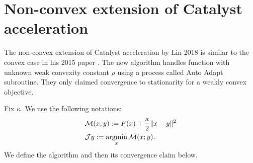 \documentclass[12pt]{article}
\begin{document}
\section{Non-convex extension of Catalyst acceleration}\label{sec:4wd-catalyst}
    The non-convex extension of Catalyst acceleration by Lin 2018 \cite{lin_catalyst_2018} is similar to the convex case in his 2015 paper \cite{lin_universal_2015}. 
    The new algorithm handles function with unknown weak convexity constant $\rho$ using a process called Auto Adapt subroutine. 
    They only claimed convergence to stationarity for a weakly convex objective. 
    \par 
    Fix $\kappa$. We use the following notations: 
    \begin{align*}
       & \mathcal M (x; y) := F(x) + \frac{\kappa}{2}\Vert x - y\Vert^2 
       \\
       & \mathcal J y := \mathop{\rm argmin}\limits_x \mathcal M (x; y). 
    \end{align*}
    We define the algorithm and then its convergence claim below. 
\end{document}
